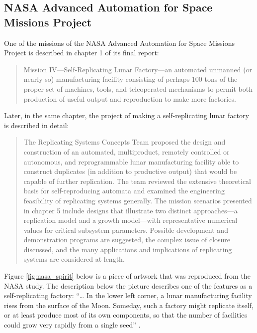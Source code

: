 \subsection[NASA Advanced Automation for Space Missions Project]{NASA
Advanced Automation for Space Missions Project}

One of the missions of the NASA Advanced Automation for Space Missions Project
is described in chapter 1 of its final report:

\begin{quote}
Mission IV---Self-Replicating Lunar Factory---an
automated unmanned (or nearly so) manufacturing facility consisting of
perhaps 100 tons of the proper set of machines, tools, and teleoperated
mechanisms to permit both production of useful output and reproduction
to make more factories. \citep{freitasgilbreath1982}
\end{quote}

Later, in the same chapter, the project of making a self-replicating lunar factory is described in detail:

\begin{quote}
The
Replicating Systems Concepts Team proposed the design and construction
of an automated, multiproduct, remotely controlled or autonomous, and
reprogrammable lunar manufacturing facility able to construct
duplicates (in addition to productive output) that would be capable of
further replication. The team reviewed the extensive theoretical basis
for self-reproducing automata and examined the engineering feasibility
of replicating systems generally. The mission scenarios presented in
chapter 5 include designs that illustrate two distinct approaches---a
replication model and a growth model---with representative numerical
values for critical subsystem parameters. Possible development and
demonstration programs are suggested, the complex issue of closure
discussed, and the many applications and implications of replicating
systems are considered at length. \citep{freitasgilbreath1982}
\end{quote}

Figure \ref{fig:nasa_spirit} below is a piece of artwork that was reproduced from the
NASA study.  The description below the picture describes one of the features as a
self-replicating factory: ``{\ldots} In the lower left corner, a lunar
manufacturing facility rises from the surface of the Moon. Someday,
such a factory might replicate itself, or at least produce most of its
own components, so that the number of facilities could grow very
rapidly from a single seed'' \citep{freitasgilbreath1982}.

